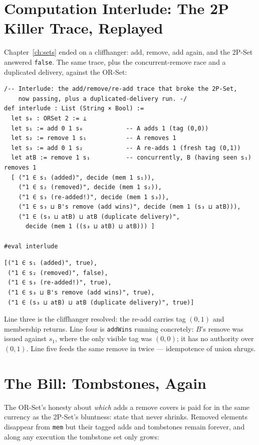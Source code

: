 \documentclass[12pt, a4paper, openright]{book}
\theoremstyle{thmstyle}
\theoremstyle{defstyle}
\newcommand{\lc}[1]{\texttt{#1}}
\begin{document}
\section{Computation Interlude: The 2P Killer Trace, Replayed}

Chapter~\ref{ch:sets} ended on a cliffhanger: add, remove, add again,
and the 2P-Set answered \lc{false}. The same trace, plus the
concurrent-remove race and a duplicated delivery, against the OR-Set:

\begin{verbatim}
/-- Interlude: the add/remove/re-add trace that broke the 2P-Set,
    now passing, plus a duplicated-delivery run. -/
def interlude : List (String × Bool) :=
  let s₀ : ORSet 2 := ⊥
  let s₁ := add 0 1 s₀            -- A adds 1 (tag (0,0))
  let s₂ := remove 1 s₁           -- A removes 1
  let s₃ := add 0 1 s₂            -- A re-adds 1 (fresh tag (0,1))
  let atB := remove 1 s₁          -- concurrently, B (having seen s₁) removes 1
  [ ("1 ∈ s₁ (added)", decide (mem 1 s₁)),
    ("1 ∈ s₂ (removed)", decide (mem 1 s₂)),
    ("1 ∈ s₃ (re-added!)", decide (mem 1 s₃)),
    ("1 ∈ s₃ ⊔ B's remove (add wins)", decide (mem 1 (s₃ ⊔ atB))),
    ("1 ∈ (s₃ ⊔ atB) ⊔ atB (duplicate delivery)",
      decide (mem 1 ((s₃ ⊔ atB) ⊔ atB))) ]

#eval interlude
\end{verbatim}

\begin{verbatim}
[("1 ∈ s₁ (added)", true),
 ("1 ∈ s₂ (removed)", false),
 ("1 ∈ s₃ (re-added!)", true),
 ("1 ∈ s₃ ⊔ B's remove (add wins)", true),
 ("1 ∈ (s₃ ⊔ atB) ⊔ atB (duplicate delivery)", true)]
\end{verbatim}

Line three is the cliffhanger resolved: the re-add carries tag $(0,1)$
and membership returns. Line four is \lc{addWins} running concretely:
$B$'s remove was issued against $s_1$, where the only visible tag was
$(0,0)$; it has no authority over $(0,1)$. Line five feeds the same
remove in twice --- idempotence of union shrugs.

\section{The Bill: Tombstones, Again}
\label{sec:tombstone-bill}

The OR-Set's honesty about \emph{which} adds a remove covers is paid
for in the same currency as the 2P-Set's bluntness: state that never
shrinks. Removed elements disappear from \lc{mem} but their tagged
adds and tombstones remain forever, and along any execution the
tombstone set only grows:
\end{document}
